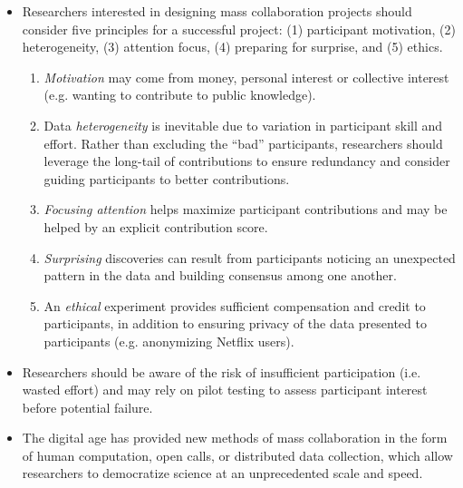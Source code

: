 \documentclass[11pt,letterpaper]{article}
\begin{document}
\begin{itemize}
\begin{enumerate}
\end{enumerate}
\item Researchers interested in designing mass collaboration projects should consider five principles for a successful project: (1) participant motivation, (2) heterogeneity, (3) attention focus, (4) preparing for surprise, and (5) ethics.
\begin{enumerate}
\item \emph{Motivation} may come from money, personal interest or collective interest (e.g. wanting to contribute to public knowledge).
\item Data \emph{heterogeneity} is inevitable due to variation in participant skill and effort. Rather than excluding the ``bad'' participants, researchers should leverage the long-tail of contributions to ensure redundancy and consider guiding participants to better contributions.
\item \emph{Focusing attention} helps maximize participant contributions and may be helped by an explicit contribution score.
\item \emph{Surprising} discoveries can result from participants noticing an unexpected pattern in the data and building consensus among one another.
\item An \emph{ethical} experiment provides sufficient compensation and credit to participants, in addition to ensuring privacy of the data presented to participants (e.g. anonymizing Netflix users).
\end{enumerate}
\item Researchers should be aware of the risk of insufficient participation (i.e. wasted effort) and may rely on pilot testing to assess participant interest before potential failure.
\item The digital age has provided new methods of mass collaboration in the form of human computation, open calls, or distributed data collection, which allow researchers to democratize science at an unprecedented scale and speed.
\end{itemize}
\end{document}

